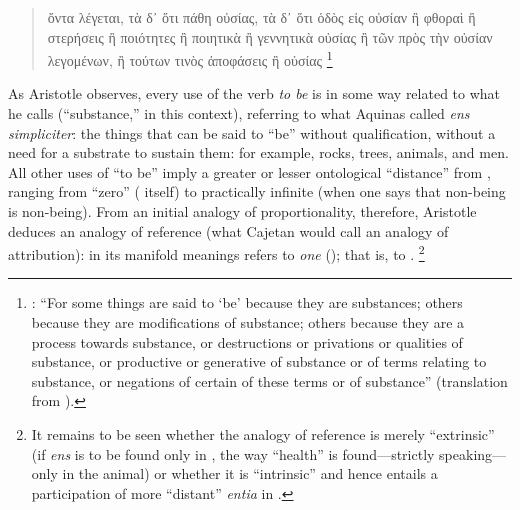 \begin{quotation}
ὄντα λέγεται, τὰ δ᾽ ὅτι πάθη οὐσίας, τὰ δ᾽ ὅτι ὁδὸς εἰς οὐσίαν ἢ φθοραὶ ἢ στερήσεις ἢ ποιότητες ἢ ποιητικὰ ἢ γεννητικὰ οὐσίας ἢ τῶν πρὸς τὴν οὐσίαν λεγομένων, ἢ τούτων τινὸς ἀποφάσεις ἢ οὐσίας%
%
\footnote{\Cite[, 2, 100ba8-10]{aristotle:metaphysics}: ``For some things are said to `be' because they are substances; others because they are modifications of substance; others because they are a process towards substance, or destructions or privations or qualities of substance, or productive or generative of substance or of terms relating to substance, or negations of certain of these terms or of substance'' (translation from \cite{aristotle:metaphysics:en}).}
\end{quotation}
%
As Aristotle observes, every use of the verb \emph{to be} is in some way related to what he calls  (``substance,'' in this context), referring to what Aquinas called \emph{ens simpliciter}: the things that can be said to ``be'' without qualification, without a need for a substrate to sustain them: for example, rocks, trees, animals, and men. All other uses of ``to be'' imply a greater or lesser ontological ``distance'' from , ranging from ``zero'' ( itself) to practically infinite (when one says that non-being is non-being). From an initial analogy of proportionality, therefore, Aristotle deduces an analogy of reference (what Cajetan would call an analogy of attribution):  in its manifold meanings refers to \emph{one} (); that is, to .%
%
\footnote{It remains to be seen whether the analogy of reference is merely ``extrinsic'' (if \emph{ens} is to be found only in , the way ``health'' is found---strictly speaking---only in the animal) or whether it is ``intrinsic'' and hence entails a participation of more ``distant'' \emph{entia} in .}

